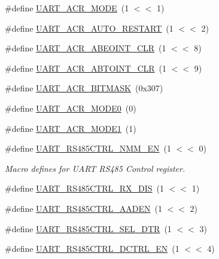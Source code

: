 \begin{DoxyCompactItemize}
\#define \hyperlink{group__UART__17XX__40XX_ga706e927ee7abf7027eb88b1e13dd2a92}{U\-A\-R\-T\-\_\-\-A\-C\-R\-\_\-\-M\-O\-D\-E}~(1 $<$$<$ 1)
\item 
\#define \hyperlink{group__UART__17XX__40XX_ga20674ae8e687d2161ef3fd88f2649036}{U\-A\-R\-T\-\_\-\-A\-C\-R\-\_\-\-A\-U\-T\-O\-\_\-\-R\-E\-S\-T\-A\-R\-T}~(1 $<$$<$ 2)
\item 
\#define \hyperlink{group__UART__17XX__40XX_ga77450ebf0f86b6b7ea363927f0cd40c2}{U\-A\-R\-T\-\_\-\-A\-C\-R\-\_\-\-A\-B\-E\-O\-I\-N\-T\-\_\-\-C\-L\-R}~(1 $<$$<$ 8)
\item 
\#define \hyperlink{group__UART__17XX__40XX_ga2e12222f359d7a5a41668cd729b0731d}{U\-A\-R\-T\-\_\-\-A\-C\-R\-\_\-\-A\-B\-T\-O\-I\-N\-T\-\_\-\-C\-L\-R}~(1 $<$$<$ 9)
\item 
\#define \hyperlink{group__UART__17XX__40XX_gae83190d58b42771ee951dfe88aada715}{U\-A\-R\-T\-\_\-\-A\-C\-R\-\_\-\-B\-I\-T\-M\-A\-S\-K}~(0x307)
\item 
\#define \hyperlink{group__UART__17XX__40XX_ga31933a99dfe9a8afac45c1f26b0cf021}{U\-A\-R\-T\-\_\-\-A\-C\-R\-\_\-\-M\-O\-D\-E0}~(0)
\item 
\#define \hyperlink{group__UART__17XX__40XX_ga25d690e49a3ccc696e031e8a1480dc1d}{U\-A\-R\-T\-\_\-\-A\-C\-R\-\_\-\-M\-O\-D\-E1}~(1)
\item 
\#define \hyperlink{group__UART__17XX__40XX_ga0b5e5ccc3ad07acad2bfa3f0846cbfd0}{U\-A\-R\-T\-\_\-\-R\-S485\-C\-T\-R\-L\-\_\-\-N\-M\-M\-\_\-\-E\-N}~(1 $<$$<$ 0)
\begin{DoxyCompactList}\small\item\em Macro defines for U\-A\-R\-T R\-S485 Control register. \end{DoxyCompactList}\item 
\#define \hyperlink{group__UART__17XX__40XX_gacdaee14296a914ca14d877069414f88f}{U\-A\-R\-T\-\_\-\-R\-S485\-C\-T\-R\-L\-\_\-\-R\-X\-\_\-\-D\-I\-S}~(1 $<$$<$ 1)
\item 
\#define \hyperlink{group__UART__17XX__40XX_ga1e4adf900200efcdfaab657b180b30d1}{U\-A\-R\-T\-\_\-\-R\-S485\-C\-T\-R\-L\-\_\-\-A\-A\-D\-E\-N}~(1 $<$$<$ 2)
\item 
\#define \hyperlink{group__UART__17XX__40XX_ga0632053088b7e65c6000274a90a76091}{U\-A\-R\-T\-\_\-\-R\-S485\-C\-T\-R\-L\-\_\-\-S\-E\-L\-\_\-\-D\-T\-R}~(1 $<$$<$ 3)
\item 
\#define \hyperlink{group__UART__17XX__40XX_gaa00bb66207fce982ed0dbd6325d8fb66}{U\-A\-R\-T\-\_\-\-R\-S485\-C\-T\-R\-L\-\_\-\-D\-C\-T\-R\-L\-\_\-\-E\-N}~(1 $<$$<$ 4)
\item 
$$
\end{DoxyCompactItemize}
